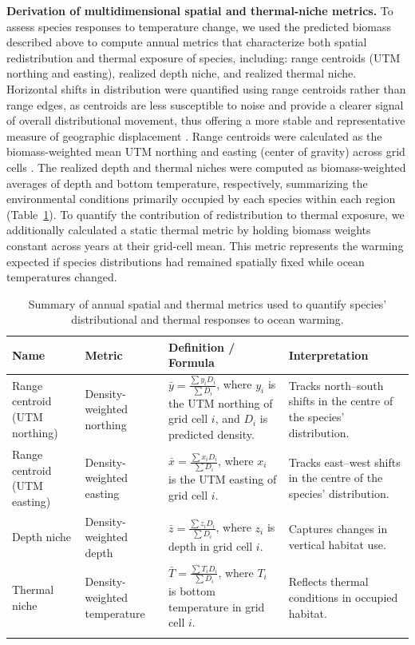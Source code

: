 \documentclass[pdflatex,sn-nature,referee]{sn-jnl}%
\begin{document}
\noindent
\textbf{Derivation of multidimensional spatial and thermal-niche metrics.} To assess species responses to temperature change, we used the predicted biomass described above to compute annual metrics that characterize both spatial redistribution and thermal exposure of species, including:  range centroids (UTM northing and easting), realized depth niche, and realized thermal niche. Horizontal shifts in distribution were quantified using range centroids rather than range edges, as centroids are less susceptible to noise and provide a clearer signal of overall distributional movement, thus offering a more stable and representative measure of geographic displacement \citep{shoo_detecting_2006}. Range centroids were calculated as the biomass-weighted mean UTM northing and easting (center of gravity) across grid cells \citep{thorson_model-based_2016}. The realized depth and thermal niches were computed as biomass-weighted averages of depth and bottom temperature, respectively,  summarizing the environmental conditions primarily occupied by each species within each region (Table~\ref{table:derived_quantities}). To quantify the contribution of redistribution to thermal exposure, we additionally calculated a static thermal metric by holding biomass weights constant across years at their grid-cell mean. This metric represents the warming expected if species distributions had remained spatially fixed while ocean temperatures changed.

\begin{table}
\caption{Summary of annual spatial and thermal metrics used to quantify species’ distributional and thermal responses to ocean warming.}
\label{table:derived_quantities}
\centering
\renewcommand{\arraystretch}{1.5}
\begin{tabular}{@{}p{3.2cm}p{3.5cm}p{5cm}p{4.3cm}@{}}
\toprule
Name & Metric & Definition / Formula & Interpretation \\
\midrule
Range centroid (UTM northing) & Density-weighted northing &
$\bar{y} = \frac{\sum y_i D_i}{\sum D_i}$, where $y_i$ is the UTM northing of grid cell $i$, and $D_i$ is predicted density. &
Tracks north–south shifts in the centre of the species’ distribution. \\
Range centroid (UTM easting) & Density-weighted easting &
$\bar{x} = \frac{\sum x_i D_i}{\sum D_i}$, where $x_i$ is the UTM easting of grid cell $i$. &
Tracks east–west shifts in the centre of the species’ distribution. \\
Depth niche & Density-weighted depth &
$\bar{z} = \frac{\sum z_i D_i}{\sum D_i}$, where $z_i$ is depth in grid cell $i$. &
Captures changes in vertical habitat use. \\
Thermal niche & Density-weighted temperature &
$\bar{T} = \frac{\sum T_i D_i}{\sum D_i}$, where $T_i$ is bottom temperature in grid cell $i$. &
Reflects thermal conditions in occupied habitat. \\
\botrule
\end{tabular}
\end{table}
\end{document}
